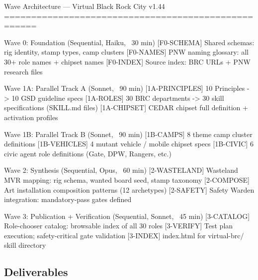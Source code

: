\documentclass[11pt,letterpaper]{article}
\begin{document}
\begin{asciibox}
Wave Architecture --- Virtual Black Rock City v1.44
====================================================

Wave 0: Foundation (Sequential, Haiku, ~30 min)
  [F0-SCHEMA]  Shared schemas: rig identity, stamp types, camp clusters
  [F0-NAMES]   PNW naming glossary: all 30+ role names + chipset names
  [F0-INDEX]   Source index: BRC URLs + PNW research files

Wave 1A: Parallel Track A (Sonnet, ~90 min)
  [1A-PRINCIPLES]  10 Principles -> 10 GSD guideline specs
  [1A-ROLES]       30 BRC departments -> 30 skill specifications (SKILL.md files)
  [1A-CHIPSET]     CEDAR chipset full definition + activation profiles

Wave 1B: Parallel Track B (Sonnet, ~90 min)
  [1B-CAMPS]       8 theme camp cluster definitions
  [1B-VEHICLES]    4 mutant vehicle / mobile chipset specs
  [1B-CIVIC]       6 civic agent role definitions (Gate, DPW, Rangers, etc.)

Wave 2: Synthesis (Sequential, Opus, ~60 min)
  [2-WASTELAND]    Wasteland MVR mapping: rig schema, wanted board seed, stamp taxonomy
  [2-COMPOSE]      Art installation composition patterns (12 archetypes)
  [2-SAFETY]       Safety Warden integration: mandatory-pass gates defined

Wave 3: Publication + Verification (Sequential, Sonnet, ~45 min)
  [3-CATALOG]      Role-chooser catalog: browsable index of all 30 roles
  [3-VERIFY]       Test plan execution; safety-critical gate validation
  [3-INDEX]        index.html for virtual-brc/ skill directory
\end{asciibox}

\subsection{Deliverables}
\end{document}
